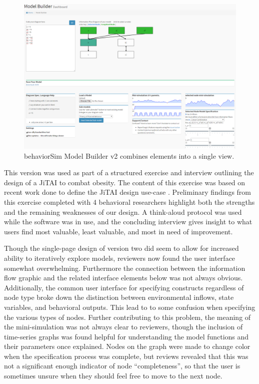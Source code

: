 \documentclass{sigchi}
\begin{document}
\begin{figure}[!t]
  \centering
  \includegraphics[width=1\columnwidth]{img/v2}  
  \caption{behaviorSim Model Builder v2 combines elements into a single view.}
  \label{model-builder-v2}
\end{figure}

This version was used as part of a structured exercise and interview outlining the design of a JiTAI to combat obesity.
The content of this exercise was based on recent work done to define the JiTAI design use-case \cite{nahum2015building}.
Preliminary findings from this exercise completed with 4 behavioral researchers highlight both the strengths and the remaining weaknesses of our design.
A think-aloud protocol was used while the software was in use, and the concluding interview gives insight to what users find most valuable, least valuable, and most in need of improvement.

Though the single-page design of version two did seem to allow for increased ability to iteratively explore models, reviewers now found the user interface somewhat overwhelming.
Furthermore the connection between the information flow graphic and the related interface elements below was not always obvious.
Additionally, the common user interface for specifying constructs regardless of node type broke down the distinction between environmental inflows, state variables, and behavioral outputs. This lead to to some confusion when specifying the various types of nodes.
Further contributing to this problem, the meaning of the mini-simulation was not always clear to reviewers, though the inclusion of time-series graphs was found helpful for understanding the model functions and their parameters once explained.
Nodes on the graph were made to change color when the specification process was complete, but reviews revealed that this was not a significant enough indicator of node ``completeness'', so that the user is sometimes unsure when they should feel free to move to the next node.
\end{document}

